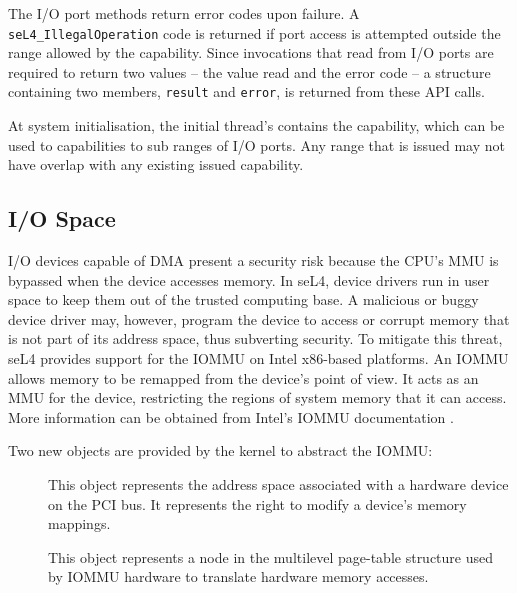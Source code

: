 The I/O port methods return error codes upon failure.
A \texttt{seL4\_IllegalOperation} code is returned if port access is
attempted outside the range allowed by the  capability.
Since invocations that
read from I/O ports are required to return two values -- the value read
and the error code -- a structure containing two members, \texttt{result}
and \texttt{error}, is returned from these API calls.

At system initialisation, the initial thread's  contains the
 capability, which can be used to 
 capabilities to sub ranges of I/O ports. Any range that is issued
may not have overlap with any existing issued  capability.

\subsection{I/O Space}
\label{sec:iospace}

I/O devices capable of DMA present a security risk because the CPU's MMU
is bypassed when the device accesses memory. In seL4, device drivers run
in user space to keep them out of the trusted computing base.
A malicious or buggy device driver may, however, program the device to
access or corrupt memory that is not part of its address space, thus
subverting security. To mitigate this threat, seL4 provides support for
the IOMMU on Intel x86-based platforms. An IOMMU allows memory to be
remapped from the device's point of view. It acts as an MMU for the
device, restricting the regions of system memory that it can access.
More information can be obtained from Intel's IOMMU documentation \cite{extra:vtd}.

Two new objects are provided by the kernel to abstract the IOMMU:
\begin{description}

    \item[] This object represents the address space associated
    with a hardware device on the PCI bus. It represents the right to
    modify a device's memory mappings.

    \item[] This object represents a node in the multilevel
    page-table structure used by IOMMU hardware to translate hardware
    memory accesses.

\end{description}

